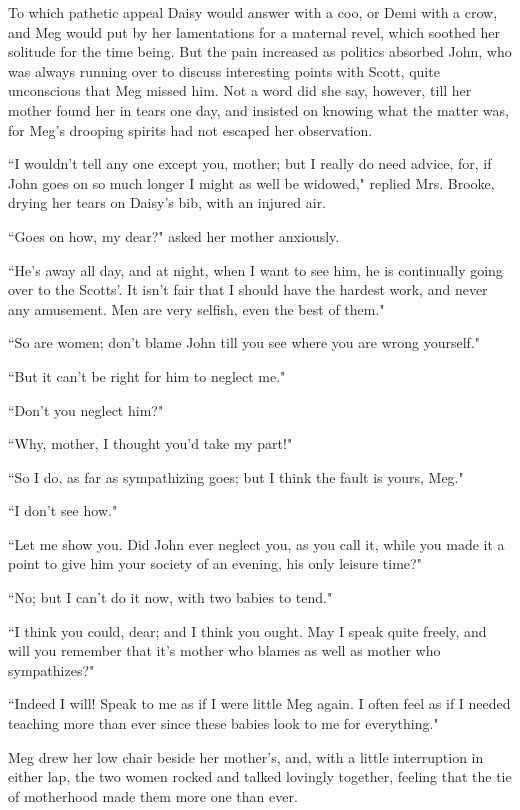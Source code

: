 To which pathetic appeal Daisy would answer with a coo, or Demi with a
crow, and Meg would put by her lamentations for a maternal revel, which
soothed her solitude for the time being. But the pain increased as
politics absorbed John, who was always running over to discuss
interesting points with Scott, quite unconscious that Meg missed him.
Not a word did she say, however, till her mother found her in tears one
day, and insisted on knowing what the matter was, for
Meg's drooping spirits had not escaped her observation.

``I wouldn't tell any one except you, mother; but I
really do need advice, for, if John goes on so much longer I might as
well be widowed," replied Mrs. Brooke, drying her tears on
Daisy's bib, with an injured air.

``Goes on how, my dear?" asked her mother anxiously.

``He's away all day, and at night, when I want to see
him, he is continually going over to the Scotts'. It
isn't fair that I should have the hardest work, and
never any amusement. Men are very selfish, even the best of them."

``So are women; don't blame John till you see where you
are wrong yourself."

``But it can't be right for him to neglect me."

``Don't you neglect him?"

``Why, mother, I thought you'd take my part!"

``So I do, as far as sympathizing goes; but I think the fault is yours,
Meg."

``I don't see how."

``Let me show you. Did John ever neglect you, as you call it, while you
made it a point to give him your society of an evening, his only leisure
time?"

``No; but I can't do it now, with two babies to tend."

``I think you could, dear; and I think you ought. May I speak quite
freely, and will you remember that it's mother who
blames as well as mother who sympathizes?"

``Indeed I will! Speak to me as if I were little Meg again. I often feel
as if I needed teaching more than ever since these babies look to me for
everything."

Meg drew her low chair beside her mother's, and, with a
little interruption in either lap, the two women rocked and talked
lovingly together, feeling that the tie of motherhood made them more one
than ever.

